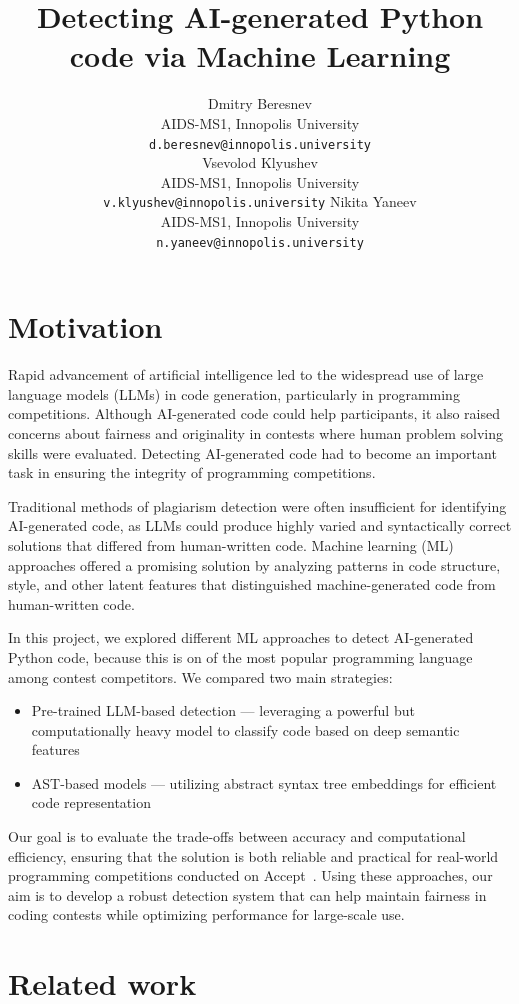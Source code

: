 \documentclass{article}
\title{Detecting AI-generated Python code via Machine Learning}
\date{}
\author{
  \hspace{1mm}Dmitry Beresnev\\
	AIDS-MS1, Innopolis University\\
	\texttt{d.beresnev@innopolis.university}\\
	\And{}
  \hspace{1mm}Vsevolod Klyushev\\
	AIDS-MS1, Innopolis University\\
	\texttt{v.klyushev@innopolis.university}	\And{}
  \hspace{1mm}Nikita Yaneev\\
	AIDS-MS1, Innopolis University\\
	\texttt{n.yaneev@innopolis.university}
}
\begin{document}
\maketitle

\section{Motivation}
Rapid advancement of artificial intelligence led to the widespread use of large language models (LLMs) in code generation, particularly in programming competitions. Although AI-generated code could help participants, it also raised concerns about fairness and originality in contests where human problem solving skills were evaluated. Detecting AI-generated code had to become an important task in ensuring the integrity of programming competitions.

Traditional methods of plagiarism detection were often insufficient for identifying AI-generated code, as LLMs could produce highly varied and syntactically correct solutions that differed from human-written code. Machine learning (ML) approaches offered a promising solution by analyzing patterns in code structure, style, and other latent features that distinguished machine-generated code from human-written code.

In this project, we explored different ML approaches to detect AI-generated Python code, because this is on of the most popular programming language among contest competitors. We compared two main strategies:


\begin{itemize}
  \item Pre-trained LLM-based detection --- leveraging a powerful but computationally heavy model to classify code based on deep semantic features
  \item AST-based models --- utilizing abstract syntax tree embeddings for efficient code representation
\end{itemize}

Our goal is to evaluate the trade-offs between accuracy and computational efficiency, ensuring that the solution is both reliable and practical for real-world programming competitions conducted on Accept~\cite{Beresnev}. Using these approaches, our aim is to develop a robust detection system that can help maintain fairness in coding contests while optimizing performance for large-scale use.

\section{Related work}
\end{document}
